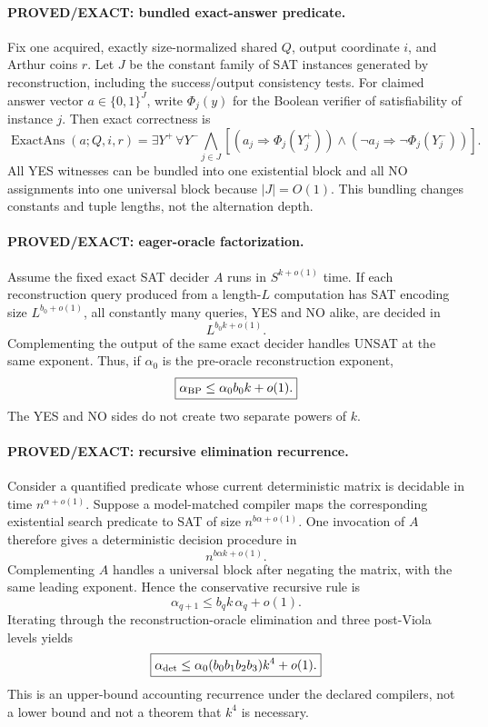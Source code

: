 \documentclass[11pt]{article}
\begin{document}
\paragraph{PROVED/EXACT: bundled exact-answer predicate.}
Fix one acquired, exactly size-normalized shared $Q$, output coordinate $i$, and Arthur coins $r$. Let $J$ be the constant family of SAT instances generated by reconstruction, including the success/output consistency tests. For claimed answer vector $a\in\{0,1\}^{J}$, write $\Phi_j(y)$ for the Boolean verifier of satisfiability of instance $j$. Then exact correctness is
\[
\boxed{
\operatorname{ExactAns}(a;Q,i,r)
=
\exists Y^+\,\forall Y^-
\bigwedge_{j\in J}
\left[(a_j\Rightarrow\Phi_j(Y_j^+))
\wedge(\neg a_j\Rightarrow\neg\Phi_j(Y_j^-))\right].
}
\]
All YES witnesses can be bundled into one existential block and all NO assignments into one universal block because $|J|=O(1)$. This bundling changes constants and tuple lengths, not the alternation depth.

\paragraph{PROVED/EXACT: eager-oracle factorization.}
Assume the fixed exact SAT decider $A$ runs in $S^{k+o(1)}$ time. If each reconstruction query produced from a length-$L$ computation has SAT encoding size $L^{b_0+o(1)}$, all constantly many queries, YES and NO alike, are decided in
\[
L^{b_0k+o(1)}.
\]
Complementing the output of the same exact decider handles UNSAT at the same exponent. Thus, if $\alpha_0$ is the pre-oracle reconstruction exponent,
\[
\boxed{\alpha_{\rm BP}\le \alpha_0 b_0k+o(1).}
\]
The YES and NO sides do not create two separate powers of $k$.

\paragraph{PROVED/EXACT: recursive elimination recurrence.}
Consider a quantified predicate whose current deterministic matrix is decidable in time $n^{\alpha+o(1)}$. Suppose a model-matched compiler maps the corresponding existential search predicate to SAT of size $n^{b\alpha+o(1)}$. One invocation of $A$ therefore gives a deterministic decision procedure in
\[
n^{b\alpha k+o(1)}.
\]
Complementing $A$ handles a universal block after negating the matrix, with the same leading exponent. Hence the conservative recursive rule is
\[
\boxed{\alpha_{q+1}\le b_q k\,\alpha_q+o(1).}
\]
Iterating through the reconstruction-oracle elimination and three post-Viola levels yields
\[
\boxed{
\alpha_{\rm det}
\le
\alpha_0(b_0b_1b_2b_3)k^4+o(1).
}
\]
This is an upper-bound accounting recurrence under the declared compilers, not a lower bound and not a theorem that $k^4$ is necessary.
\end{document}
